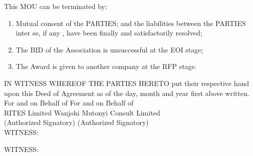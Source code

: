 		This  MOU can be terminated by:

	\begin{enumerate}

		\item Mutual consent of the PARTIES; and the liabilities between the PARTIES inter se, if any , have been finally and satisfactorily resolved;
		\item The BID of the Association is unsuccessful at the EOI stage;
		\item The Award is given to another company at the RFP stage.
		
	\end{enumerate}
	


      
IN WITNESS WHEREOF THE PARTIES HERETO put their respective hand upon this Deed of Agreement as of the day, month and year first above written.\\


For and on Behalf of \hfill For and on Behalf of \\
RITES Limited    \hfill  Wanjohi Mutonyi Consult Limited \\



(Authorized Signatory) \hfill  (Authorized Signatory)\\



WITNESS:



WITNESS:

